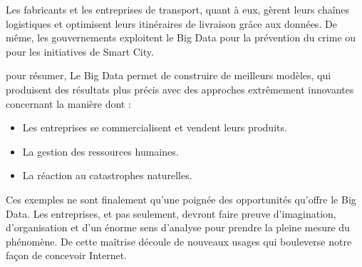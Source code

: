 Les fabricants et les entreprises de transport, quant à eux, gèrent leurs chaînes logistiques et optimisent leurs itinéraires de livraison grâce aux données. De même, les gouvernements exploitent le Big Data pour la prévention du crime ou pour les initiatives de Smart City.

pour résumer, Le Big Data permet de construire de meilleurs modèles, qui produisent
des résultats plus précis avec des approches extrêmement innovantes concernant
la manière dont :

\begin{itemize}[label=\textbullet]
	\item Les entreprises se commercialisent et vendent leurs produits.
	\item La gestion des ressources humaines.
	\item La réaction au catastrophes naturelles.
\end{itemize}

Ces exemples ne sont finalement qu'une poignée des opportunités qu'offre le Big Data. Les entreprises, et pas seulement, devront faire preuve d'imagination, d'organisation et d'un énorme sens d'analyse pour prendre la pleine mesure du phénomène. De cette maîtrise découle de nouveaux usages qui bouleverse notre façon de concevoir
Internet.


